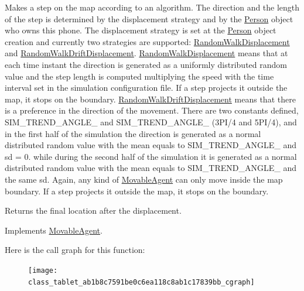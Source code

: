 Makes a step on the map according to an algorithm. The direction and the length of the step is determined by the displacement strategy and by the \hyperlink{class_person}{Person} object who owns this phone. The displacement strategy is set at the \hyperlink{class_person}{Person} object creation and currently two strategies are supported\+: \hyperlink{class_random_walk_displacement}{Random\+Walk\+Displacement} and \hyperlink{class_random_walk_drift_displacement}{Random\+Walk\+Drift\+Displacement}. \hyperlink{class_random_walk_displacement}{Random\+Walk\+Displacement} means that at each time instant the direction is generated as a uniformly distributed random value and the step length is computed multiplying the speed with the time interval set in the simulation configuration file. If a step projects it outside the map, it stops on the boundary. \hyperlink{class_random_walk_drift_displacement}{Random\+Walk\+Drift\+Displacement} means that there is a preference in the direction of the movement. There are two constants defined, S\+I\+M\+\_\+\+T\+R\+E\+N\+D\+\_\+\+A\+N\+G\+L\+E\+\_ and S\+I\+M\+\_\+\+T\+R\+E\+N\+D\+\_\+\+A\+N\+G\+L\+E\+\_ (3\+P\+I/4 and 5\+P\+I/4), and in the first half of the simulation the direction is generated as a normal distributed random value with the mean equals to S\+I\+M\+\_\+\+T\+R\+E\+N\+D\+\_\+\+A\+N\+G\+L\+E\+\_ and sd = 0. while during the second half of the simulation it is generated as a normal distributed random value with the mean equals to S\+I\+M\+\_\+\+T\+R\+E\+N\+D\+\_\+\+A\+N\+G\+L\+E\+\_ and the same sd. Again, any kind of \hyperlink{class_movable_agent}{Movable\+Agent} can only move inside the map boundary. If a step projects it outside the map, it stops on the boundary. \begin{DoxyReturn}{Returns}
the final location after the displacement. 
\end{DoxyReturn}


Implements \hyperlink{class_movable_agent_a88b617f0e78c817634e5b587da045ab0}{Movable\+Agent}.

Here is the call graph for this function\+:\nopagebreak
\begin{figure}[H]
\begin{center}
\leavevmode
\texttt{[image: class\_tablet\_ab1b8c7591be0c6ea118c8ab1c17839bb\_cgraph]}
\end{center}
\end{figure}
\mbox{\label{class_tablet_a3fae01e7d526699476221c6a686a4fba}} 
